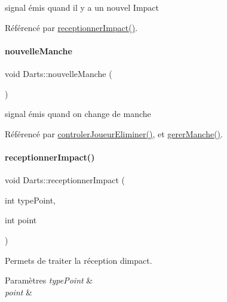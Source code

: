 signal émis quand il y a un nouvel Impact 



Référencé par \hyperlink{darts_8cpp_source_l00223}{receptionner\+Impact()}.

\mbox{\label{class_darts_ace3f99f5381399b0b86e5b8192d6fd71}} 
\paragraph{\texorpdfstring{nouvelle\+Manche}{nouvelleManche}}
{\footnotesize\ttfamily void Darts\+::nouvelle\+Manche (\begin{DoxyParamCaption}{ }\end{DoxyParamCaption})\hspace{0.3cm}{\ttfamily [signal]}}



signal émis quand on change de manche 



Référencé par \hyperlink{darts_8cpp_source_l00349}{controler\+Joueur\+Eliminer()}, et \hyperlink{darts_8cpp_source_l00303}{gerer\+Manche()}.

\mbox{\label{class_darts_a196bc4307c631310f641606012ab9e05}} 
\paragraph{\texorpdfstring{receptionner\+Impact()}{receptionnerImpact()}}
{\footnotesize\ttfamily void Darts\+::receptionner\+Impact (\begin{DoxyParamCaption}\item[{int}]{type\+Point,  }\item[{int}]{point }\end{DoxyParamCaption})}



Permets de traiter la réception d\textquotesingle{}impact. 


\begin{DoxyParams}{Paramètres}
{\em type\+Point} & \\
\hline
{\em point} & \\
\hline
\end{DoxyParams}


